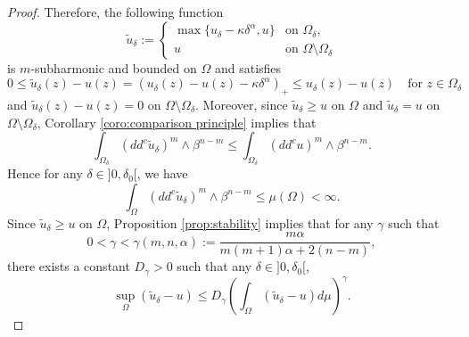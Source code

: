 \begin{proof}
Therefore, the following function
\[
\tilde{u}_{\delta}:= \begin{cases}
\max\{{u}_{\delta} - \kappa \delta^{\alpha},u \} &\text{on } \Omega_{\delta}, \\
u &\text{on } \Omega\setminus\Omega_{\delta}
\end{cases}
\]
is $m$-subharmonic and bounded on $\Omega$ and satisfies
\[
0 \leq \tilde{u}_{\delta}(z) - u (z) =(u_\delta (z) - u (z) - \kappa \delta^{\alpha})_+ \leq u_\delta (z) - u (z)\quad \text{for }z\in \Omega_{\delta}
\]
and $\tilde{u}_{\delta}(z) - u (z) = 0$ on $\Omega \setminus \Omega_\delta$. Moreover, since $ \tilde{u}_{\delta} \geq u$ on $ \Omega$ and $\tilde{u}_{\delta} = u$ on $\Omega \setminus \Omega_\delta$, Corollary \ref{coro:comparison principle} implies that
\[
\int_{\Omega_\delta}(dd^c\tilde{u}_{\delta})^m\wedge\beta^{n-m}\leq\int_{\Omega_\delta}(dd^c u)^m\wedge\beta^{n-m}.
\]
Hence for any $\delta\in{}]0,\delta_0[$, we have
\[
\int_{\Omega}(dd^c\tilde{u}_{\delta})^m\wedge\beta^{n-m} \leq \mu (\Omega) < \infty.
\]
Since $\tilde u_\delta \geq u$ on $\Omega$, Proposition \ref{prop:stability} implies that for any $\gamma$ such that
\[
0<\gamma < \gamma (m,n,\alpha):= \frac{m \alpha}{ m (m + 1) \alpha + 2 (n-m)},
\]
there exists a constant $D_\gamma > 0$ such that any $\delta\in{}]0,\delta_0[$,
\begin{equation} \label{eq2}
\sup_{\Omega}(\tilde{u}_{\delta}-u) \leq D_{\gamma} \left(\int_{\Omega}(\tilde{u}_{\delta}-u) d\mu\right)^{\gamma}.
\end{equation}


\end{proof}
